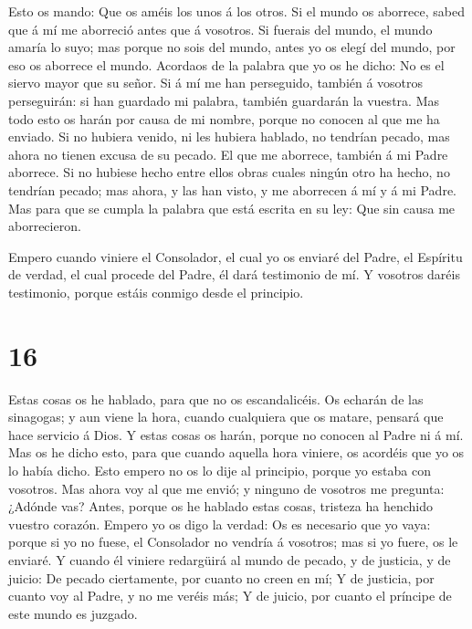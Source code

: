  Esto os mando: Que os améis los unos á los otros.
 Si el mundo os aborrece, sabed que á mí me aborreció antes
que á vosotros.  Si fuerais del mundo, el mundo amaría lo
suyo; mas porque no sois del mundo, antes yo os elegí del mundo, por eso
os aborrece el mundo.  Acordaos de la palabra que yo os he
dicho: No es el siervo mayor que su señor. Si á mí me han perseguido,
también á vosotros perseguirán: si han guardado mi palabra, también
guardarán la vuestra.  Mas todo esto os harán por causa de
mi nombre, porque no conocen al que me ha enviado.  Si no
hubiera venido, ni les hubiera hablado, no tendrían pecado, mas ahora no
tienen excusa de su pecado.  El que me aborrece, también á
mi Padre aborrece.  Si no hubiese hecho entre ellos obras
cuales ningún otro ha hecho, no tendrían pecado; mas ahora, y las han
visto, y me aborrecen á mí y á mi Padre.  Mas para que se
cumpla la palabra que está escrita en su ley: Que sin causa me
aborrecieron.

 Empero cuando viniere el Consolador, el cual yo os enviaré
del Padre, el Espíritu de verdad, el cual procede del Padre, él dará
testimonio de mí.  Y vosotros daréis testimonio, porque
estáis conmigo desde el principio.

\hypertarget{section-15}{%
\section{16}\label{section-15}}

 Estas cosas os he hablado, para que no os escandalicéis.
 Os echarán de las sinagogas; y aun viene la hora, cuando
cualquiera que os matare, pensará que hace servicio á Dios. 
Y estas cosas os harán, porque no conocen al Padre ni á mí. 
Mas os he dicho esto, para que cuando aquella hora viniere, os acordéis
que yo os lo había dicho. Esto empero no os lo dije al principio, porque
yo estaba con vosotros.  Mas ahora voy al que me envió; y
ninguno de vosotros me pregunta: ¿Adónde vas?  Antes, porque
os he hablado estas cosas, tristeza ha henchido vuestro corazón.
 Empero yo os digo la verdad: Os es necesario que yo vaya:
porque si yo no fuese, el Consolador no vendría á vosotros; mas si yo
fuere, os le enviaré.  Y cuando él viniere redargüirá al
mundo de pecado, y de justicia, y de juicio:  De pecado
ciertamente, por cuanto no creen en mí;  Y de justicia, por
cuanto voy al Padre, y no me veréis más;  Y de juicio, por
cuanto el príncipe de este mundo es juzgado.

